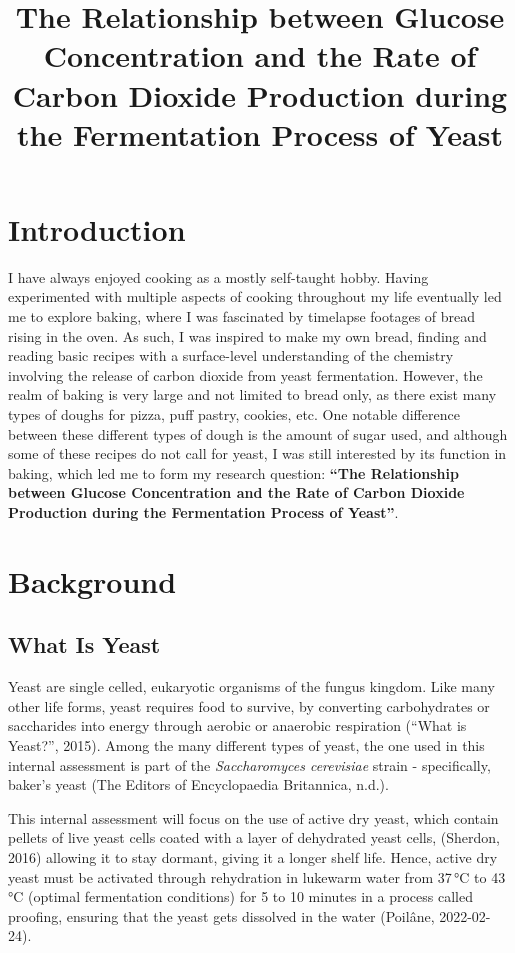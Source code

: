 \documentclass{article}
\title{\textbf{The Relationship between Glucose Concentration and the Rate of Carbon Dioxide Production during the Fermentation Process of Yeast}}
\author{}
\date{}
\begin{document}
\maketitle
\newpage
{}

\section{Introduction}
I have always enjoyed cooking as a mostly self-taught hobby. Having experimented with multiple aspects of cooking throughout my life eventually led me to explore baking, where I was fascinated by timelapse footages of bread rising in the oven. As such, I was inspired to make my own bread, finding and reading basic recipes with a surface-level understanding of the chemistry involving the release of carbon dioxide from yeast fermentation. However, the realm of baking is very large and not limited to bread only, as there exist many types of doughs for pizza, puff pastry, cookies, etc. One notable difference between these different types of dough is the amount of sugar used, and although some of these recipes do not call for yeast, I was still interested by its function in baking, which led me to form my research question: \textbf{``The Relationship between Glucose Concentration and the Rate of Carbon Dioxide Production during the Fermentation Process of Yeast''}.

\section{Background}

\subsection{What Is Yeast}
Yeast are single celled, eukaryotic organisms of the fungus kingdom. Like many other life forms, yeast requires food to survive, by converting carbohydrates or saccharides into energy through aerobic or anaerobic respiration (“What is Yeast?”, 2015). Among the many different types of yeast, the one used in this internal assessment is part of the \emph{Saccharomyces cerevisiae} strain - specifically, baker's yeast (The Editors
of Encyclopaedia Britannica, n.d.).

\medskip

This internal assessment will focus on the use of active dry yeast, which contain pellets of live yeast cells coated with a layer of dehydrated yeast cells, (Sherdon, 2016) allowing it to stay dormant, giving it a longer shelf life. Hence, active dry yeast must be activated through rehydration in lukewarm water from 37\,\si{\celsius} to 43\,\si{\celsius} (optimal fermentation conditions) for 5 to 10 minutes in a process called proofing, ensuring that the yeast gets dissolved in the water (Poilâne, 2022-02-24).
\end{document}
